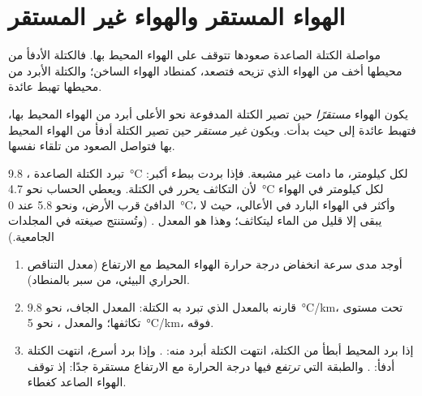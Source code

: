 \section{الهواء المستقر والهواء غير المستقر}

مواصلة الكتلة الصاعدة صعودها تتوقف على الهواء المحيط بها. فالكتلة الأدفأ من
محيطها أخف من الهواء الذي تزيحه فتصعد، كمنطاد الهواء الساخن؛ والكتلة الأبرد من
محيطها تهبط عائدة.

\begin{definition}\label{def:g10:why-clouds-form:stability}
يكون الهواء \emph{مستقرًا} حين تصير الكتلة المدفوعة نحو الأعلى
أبرد من الهواء المحيط بها، فتهبط عائدة إلى حيث بدأت. ويكون
\emph{غير مستقر} حين تصير الكتلة أدفأ من الهواء المحيط بها
فتواصل الصعود من تلقاء نفسها.
\end{definition}

تبرد الكتلة الصاعدة ، \qty{9.8}{\degreeCelsius} لكل
كيلومتر، ما دامت غير مشبعة. فإذا  بردت ببطء أكبر: لأن التكاثف يحرر  في الكتلة. ويعطي الحساب نحو \qty{4.7}{\degreeCelsius} لكل كيلومتر في الهواء
الدافئ قرب الأرض، ونحو \num{5.8} عند \qty{0}{\degreeCelsius}، وأكثر في الهواء
البارد في الأعالي، حيث لا يبقى إلا قليل من الماء ليتكاثف؛ وهذا هو المعدل .
(وتُستنتج صيغته في المجلدات الجامعية.)

\begin{method}\label{met:g10:why-clouds-form:stable}
\begin{enumerate}
  \item أوجد مدى سرعة انخفاض درجة حرارة الهواء المحيط مع الارتفاع (معدل التناقص
        الحراري البيئي، من سبر بالمنطاد).
  \item قارنه بالمعدل الذي تبرد به الكتلة: المعدل الجاف، نحو
        \qty{9.8}{\degreeCelsius/km}، تحت مستوى تكاثفها؛ والمعدل ، نحو
        \qty{5}{\degreeCelsius/km}، فوقه.
  \item إذا برد المحيط أبطأ من الكتلة، انتهت الكتلة أبرد منه: . وإذا
        برد أسرع، انتهت الكتلة أدفأ: . والطبقة التي \emph{ترتفع}
        فيها درجة الحرارة مع الارتفاع مستقرة جدًا: إذ توقف الهواء الصاعد كغطاء.
\end{enumerate}
\end{method}

